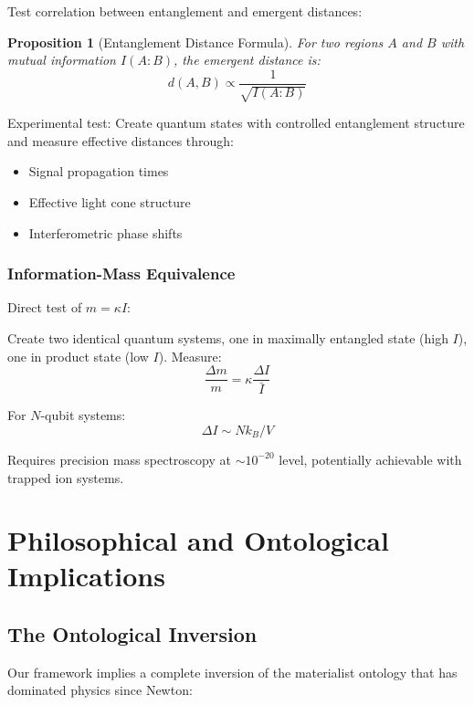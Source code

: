 \documentclass[12pt,a4paper]{article}
\newtheorem{proposition}[theorem]{Proposition}
\theoremstyle{remark}
\begin{document}
Test correlation between entanglement and emergent distances:

\begin{proposition}[Entanglement Distance Formula]
For two regions $A$ and $B$ with mutual information $I(A:B)$, the emergent distance is:
\begin{equation}
d(A,B) \propto \frac{1}{\sqrt{I(A:B)}}
\end{equation}
\end{proposition}

Experimental test: Create quantum states with controlled entanglement structure and measure effective distances through:
\begin{itemize}
\item Signal propagation times
\item Effective light cone structure
\item Interferometric phase shifts
\end{itemize}

\subsubsection{Information-Mass Equivalence}

Direct test of $m = \kappa I$:

Create two identical quantum systems, one in maximally entangled state (high $I$), one in product state (low $I$). Measure:
\begin{equation}
\frac{\Delta m}{m} = \kappa\frac{\Delta I}{\bar{I}}
\end{equation}

For $N$-qubit systems:
\begin{equation}
\Delta I \sim N k_B/V
\end{equation}

Requires precision mass spectroscopy at $\sim 10^{-20}$ level, potentially achievable with trapped ion systems.

\section{Philosophical and Ontological Implications}
\label{sec:implications}

\subsection{The Ontological Inversion}

Our framework implies a complete inversion of the materialist ontology that has dominated physics since Newton:
\end{document}
